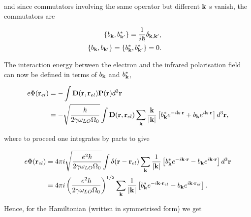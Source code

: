 and since commutators involving the same operator but different $\vb{k}$ s vanish, the commutators are

\begin{subequations}
\begin{align}
    \begin{split}
        \left\{b_{\vb{k}},b^*_{\vb{k'}}\right\} &= \frac{1}{i\hbar} \delta_{\vb{k}, \vb{k'}},
    \end{split}\\
    \begin{split}
        \left\{b_{\vb{k}},b_{\vb{k'}}\right\} &= \left\{b^*_{\vb{k}},b^*_{\vb{k'}}\right\} = 0.
    \end{split}
\end{align}
\end{subequations}  

The interaction energy between the electron and the infrared polarisation field can now be defined in terms of $b_{\vb{k}}$ and $b^*_{\vb{k}}$,

\begin{equation}
    \begin{aligned}
    e \Phi (\vb{r}_{el}) &= - \int \vb{D}(\vb{r}, \vb{r}_{el}) \vb{P}(\vb{r}) d^3\vb{r} \\
    &= -\sqrt{\frac{\hbar}{2\gamma\omega_{LO}\Omega_0}} \int \vb{D}(\vb{r}, \vb{r}_{el}) \sum_{\vb{k}} \frac{\vb{k}}{\abs{\vb{k}}} \left[b_{\vb{k}}^* e^{-i\vb{k}\cdot\vb{r}} + b_{\vb{k}} e^{i\vb{k}\cdot\vb{r}} \right] d^3\vb{r},
    \end{aligned}
\end{equation}

where to proceed one integrates by parts to give

\begin{equation} \label{eqn:phi}
    \begin{aligned}
    e \Phi (\vb{r}_{el}) &= 4\pi i \sqrt{\frac{e^2 \hbar}{2\gamma\omega_{LO}\Omega_0}} \int \delta(\vb{r} - \vb{r}_{el}) \sum_{\vb{k}} \frac{1}{\abs{\vb{k}}} \left[b_{\vb{k}}^* e^{-i\vb{k}\cdot\vb{r}} - b_{\vb{k}} e^{i\vb{k}\cdot\vb{r}} \right] d^3\vb{r} \\
    &= 4\pi i \left( \frac{e^2 \hbar}{2 \gamma \omega_{LO} \Omega_0} \right)^{1/2} \sum_{\vb{k}} \frac{1}{\abs{\vb{k}}} \left[b_{\vb{k}}^* e^{-i\vb{k} \cdot \vb{r}_{el}} - b_{\vb{k}} e^{i\vb{k} \cdot \vb{r}_{el}}\right].
    \end{aligned}
\end{equation}

Hence, for the Hamiltonian (written in symmetrised form) we get

